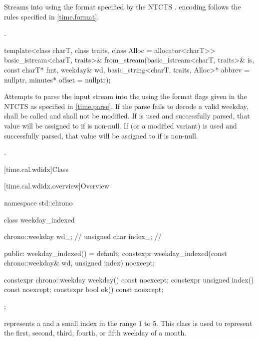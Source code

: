 \begin{itemdescr}
\pnum
\effects
Streams  into  using
the format specified by the NTCTS .
 encoding follows the rules specified in \ref{time.format}.

\pnum
\returns {}.
\end{itemdescr}

%
\begin{itemdecl}
template<class charT, class traits, class Alloc = allocator<charT>>
  basic_istream<charT, traits>&
    from_stream(basic_istream<charT, traits>& is, const charT* fmt,
                weekday& wd, basic_string<charT, traits, Alloc>* abbrev = nullptr,
                minutes* offset = nullptr);
\end{itemdecl}

\begin{itemdescr}
\pnum
\effects
Attempts to parse the input stream 
into the   using
the format flags given in the NTCTS 
as specified in \ref{time.parse}.
If the parse fails to decode a valid weekday,
 shall be called
and  shall not be modified.
If  is used and successfully parsed,
that value will be assigned to  if  is non-null.
If  (or a modified variant) is used and successfully parsed,
that value will be assigned to  if  is non-null.

\pnum
\returns {}.
\end{itemdescr}

[time.cal.wdidx]{Class }

[time.cal.wdidx.overview]{Overview}

\begin{codeblock}
namespace std::chrono {
  class weekday_indexed {
    chrono::weekday  wd_;       // \expos
    unsigned char    index_;    // \expos

  public:
    weekday_indexed() = default;
    constexpr weekday_indexed(const chrono::weekday& wd, unsigned index) noexcept;

    constexpr chrono::weekday weekday() const noexcept;
    constexpr unsigned        index()   const noexcept;
    constexpr bool ok() const noexcept;
  };
}
\end{codeblock}

\pnum
{} represents a 
and a small index in the range 1 to 5.
This class is used to represent the
first, second, third, fourth, or fifth weekday of a month.

